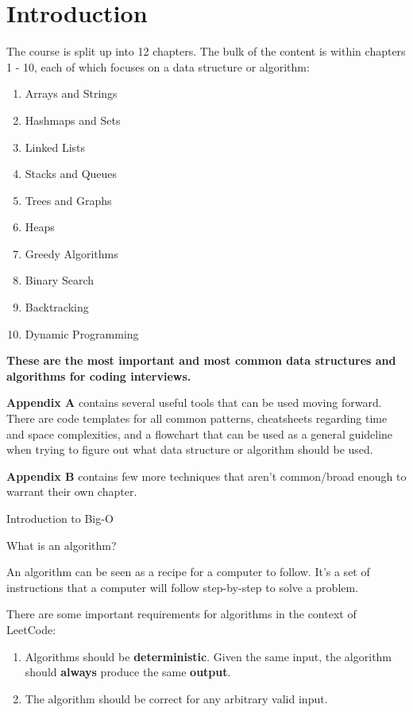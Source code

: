 \chapter{Introduction}
\label{introduction}

The course is split up into 12 chapters. The bulk of the content is within chapters 1 - 10, each of which focuses on a data structure or algorithm:

\begin{enumerate}
	\item{} Arrays and Strings
	\item{} Hashmaps and Sets
	\item{} Linked Lists
	\item{} Stacks and Queues
	\item{} Trees and Graphs
	\item{} Heaps
	\item{} Greedy Algorithms
	\item{} Binary Search
	\item{} Backtracking
	\item{} Dynamic Programming
\end{enumerate}

\textbf{These are the most important and most common data structures and algorithms for coding interviews.}

\textbf{Appendix A} contains several useful tools that can be used moving forward. There are code templates for all common patterns, cheatsheets regarding time and space complexities, and a flowchart that can be used as a general guideline when trying to figure out what data structure or algorithm should be used.

\textbf{Appendix B} contains few more techniques that aren't common/broad enough to warrant their own chapter.

\pagebreak

{\huge Introduction to Big-O}

{\large What is an algorithm?}

An algorithm can be seen as a recipe for a computer to follow. It's a set of instructions that a computer will follow step-by-step to solve a problem.

There are some important requirements for algorithms in the context of LeetCode:

\begin{enumerate}
	\item{} Algorithms should be \textbf{deterministic}. Given the same input, the algorithm should \textbf{always} produce the same \textbf{output}.
	\item{} The algorithm should be correct for any arbitrary valid input.
\end{enumerate}

